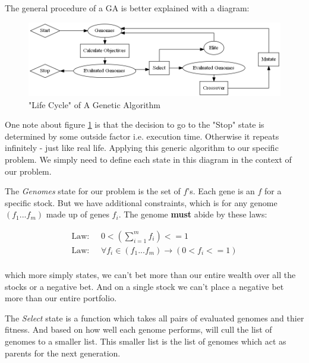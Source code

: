 \documentclass[12pt]{article}
\begin{document}
    \pagebreak
    The general procedure of a GA is better explained with a diagram:

    \begin{figure}[h] %
        \centering
        \includegraphics[width=\textwidth]{GA}
        \caption{"Life Cycle" of A Genetic Algorithm}\label{fig:GA}
    \end{figure}

    One note about figure \ref{fig:GA} is that the decision to go to the "Stop"
    state is determined by some outside factor i.e. execution time. Otherwise
    it repeats infinitely - just like real life. Applying this generic algorithm to 
    our specific problem. We simply need to
    define each state in this diagram in the context of our problem.

    The \textit{Genomes} state for our problem is the set of \(f\)'s. Each gene is an
    \(f\) for a specific stock. But we have additional constraints, which is for 
    any genome \((f_1...f_m)\) made up of genes \(f_i\). The genome \textbf{must}
    abide by these laws:

    \begin{align*}
        \text{Law: } & \;
        0 < \left(
            \displaystyle\sum^{m}_{i=1} f_i
        \right) <= 1 \\
        \text{Law: } & \;
        \forall f_i \in (f_1...f_m) \to \left(
            0 < f_i <= 1
        \right) \\
    \end{align*}

    which more simply states, we can't bet more than our entire wealth over all the stocks or
    a negative bet. And on a single stock we can't place a negative bet more than our
    entire portfolio.

    The \textit{Select} state is a function which takes all pairs of evaluated genomes
    and thier fitness. And based on how well each genome performs, will cull the
    list of genomes to a smaller list. This smaller list is the list of genomes
    which act as parents for the next generation.
\end{document}
